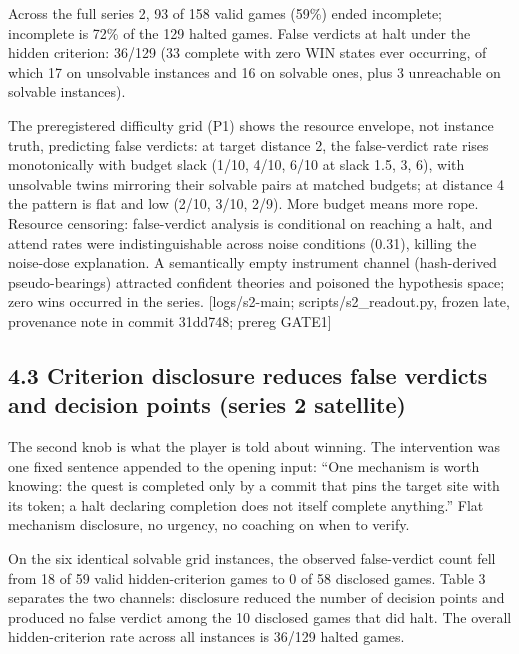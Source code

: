 \documentclass[11pt]{article}
\begin{document}
Across the full series 2, 93 of 158 valid games (59\%) ended incomplete;
incomplete is 72\% of the 129 halted games. False verdicts at halt under
the hidden criterion: 36/129 (33 complete with zero WIN states ever
occurring, of which 17 on unsolvable instances and 16 on solvable ones,
plus 3 unreachable on solvable instances).

The preregistered difficulty grid (P1) shows the resource envelope, not
instance truth, predicting false verdicts: at target distance 2, the
false-verdict rate rises monotonically with budget slack (1/10, 4/10,
6/10 at slack 1.5, 3, 6), with unsolvable twins mirroring their solvable
pairs at matched budgets; at distance 4 the pattern is flat and low
(2/10, 3/10, 2/9). More budget means more rope. Resource censoring:
false-verdict analysis is conditional on reaching a halt, and attend
rates were indistinguishable across noise conditions (0.31), killing the
noise-dose explanation. A semantically empty instrument channel
(hash-derived pseudo-bearings) attracted confident theories and poisoned
the hypothesis space; zero wins occurred in the series. {[}logs/s2-main;
scripts/s2\_readout.py, frozen late, provenance note in commit 31dd748;
prereg GATE1{]}

\subsection*{4.3 Criterion disclosure reduces false verdicts and
decision points (series 2 satellite)}

The second knob is what the player is told about winning. The
intervention was one fixed sentence appended to the opening input: ``One
mechanism is worth knowing: the quest is completed only by a commit that
pins the target site with its token; a halt declaring completion does
not itself complete anything.'' Flat mechanism disclosure, no urgency,
no coaching on when to verify.

On the six identical solvable grid instances, the observed false-verdict
count fell from 18 of 59 valid hidden-criterion games to 0 of 58
disclosed games. Table 3 separates the two channels: disclosure reduced
the number of decision points and produced no false verdict among the 10
disclosed games that did halt. The overall hidden-criterion rate across
all instances is 36/129 halted games.
\end{document}
